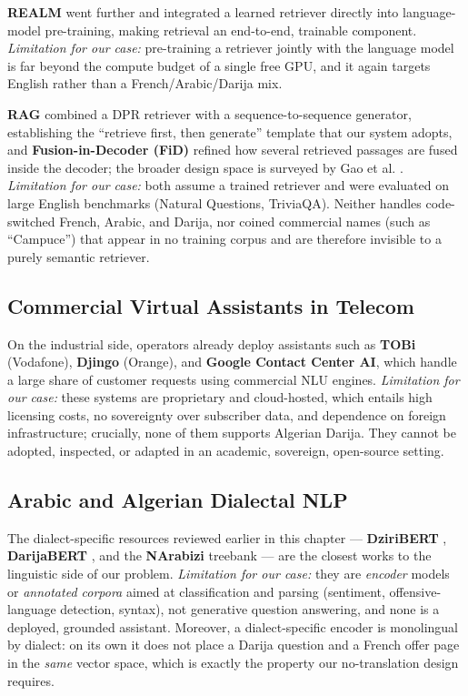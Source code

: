 \documentclass[12pt, a4paper]{report}
\newcommand{\sourced}[1]{#1}        %
\newcommand{\humantext}[1]{#1}      %
\begin{document}
\sourced{\textbf{REALM} \cite{guu2020realm} went further and integrated a learned retriever directly into language-model pre-training, making retrieval an end-to-end, trainable component.} \humantext{\emph{Limitation for our case:} pre-training a retriever jointly with the language model is far beyond the compute budget of a single free GPU, and it again targets English rather than a French/Arabic/Darija mix.}

\sourced{\textbf{RAG} \cite{lewis2020rag} combined a DPR retriever with a sequence-to-sequence generator, establishing the ``retrieve first, then generate'' template that our system adopts, and \textbf{Fusion-in-Decoder (FiD)} \cite{izacard2021fid} refined how several retrieved passages are fused inside the decoder; the broader design space is surveyed by Gao et al. \cite{gao2023ragsurvey}.} \humantext{\emph{Limitation for our case:} both assume a trained retriever and were evaluated on large English benchmarks (Natural Questions, TriviaQA). Neither handles code-switched French, Arabic, and Darija, nor coined commercial names (such as ``Campuce'') that appear in no training corpus and are therefore invisible to a purely semantic retriever.}

\subsection{Commercial Virtual Assistants in Telecom}
\humantext{On the industrial side, operators already deploy assistants such as \textbf{TOBi} (Vodafone), \textbf{Djingo} (Orange), and \textbf{Google Contact Center AI}, which handle a large share of customer requests using commercial NLU engines.} \humantext{\emph{Limitation for our case:} these systems are proprietary and cloud-hosted, which entails high licensing costs, no sovereignty over subscriber data, and dependence on foreign infrastructure; crucially, none of them supports Algerian Darija. They cannot be adopted, inspected, or adapted in an academic, sovereign, open-source setting.}

\subsection{Arabic and Algerian Dialectal NLP}
\humantext{The dialect-specific resources reviewed earlier in this chapter --- \textbf{DziriBERT} \cite{abdaoui2021dziribert}, \textbf{DarijaBERT} \cite{gaanoun2024darijabert}, and the \textbf{NArabizi} treebank \cite{seddah2020narabizi} --- are the closest works to the linguistic side of our problem.} \humantext{\emph{Limitation for our case:} they are \emph{encoder} models or \emph{annotated corpora} aimed at classification and parsing (sentiment, offensive-language detection, syntax), not generative question answering, and none is a deployed, grounded assistant. Moreover, a dialect-specific encoder is monolingual by dialect: on its own it does not place a Darija question and a French offer page in the \emph{same} vector space, which is exactly the property our no-translation design requires.}
\end{document}
